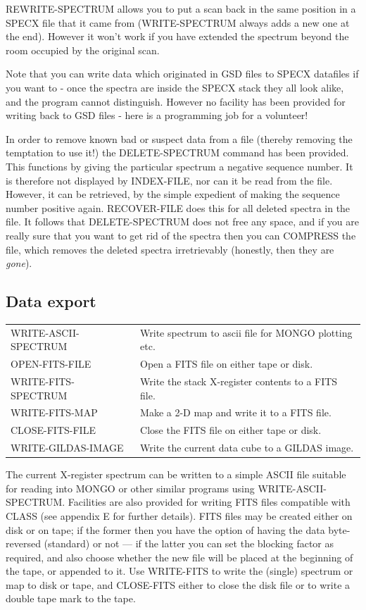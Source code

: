 \documentclass[11pt,twoside]{report}
\begin{document}
REWRITE-SPECTRUM allows you to put a scan back in the same position in a
SPECX file that it came from (WRITE-SPECTRUM always adds a new one at the end).
However it won't work if you have extended the spectrum beyond the room occupied
by the original scan.

Note that you can write data which originated in GSD files to SPECX datafiles
if you want to - once the spectra are inside the SPECX stack they all look
alike, and the program cannot distinguish. However no facility has been provided
for writing back to GSD files - here is a programming job for a volunteer!

In order to remove known bad or suspect data from a file (thereby removing the
temptation to use it!) the DELETE-SPECTRUM command has been provided. This
functions by giving the particular spectrum a negative sequence number. It is
therefore not displayed by INDEX-FILE, nor can it be read from the file.
However, it can be retrieved, by the simple expedient of making the sequence
number positive again. RECOVER-FILE does this for all deleted spectra in the
file. It follows that DELETE-SPECTRUM does not free any space, and if you are
really sure that you want to get rid of the spectra then you can COMPRESS the
file, which removes the deleted spectra irretrievably (honestly, then they are
{\em gone}).

\subsection{Data export}

\begin{tabular}{ll}
WRITE-ASCII-SPECTRUM   & Write spectrum to ascii file for MONGO plotting etc.\\
OPEN-FITS-FILE  & Open a FITS file on either tape or disk.\\
WRITE-FITS-SPECTRUM    & Write the stack X-register contents to a FITS file.\\
WRITE-FITS-MAP         & Make a 2-D map and write it to a FITS file.\\
CLOSE-FITS-FILE        & Close the FITS file on either tape or disk.\\
WRITE-GILDAS-IMAGE     & Write the current data cube to a GILDAS image.\\
\end{tabular}

The current X-register spectrum can be written to a simple ASCII file
suitable for reading into MONGO  or other similar programs using
WRITE-ASCII-SPECTRUM. Facilities are also provided for writing FITS
 files compatible with CLASS  (see appendix E for
further details). FITS files may be created either on disk or on tape; if the
former then you have the option of having the data byte-reversed (standard)
or not --- if the latter you can set the blocking factor as required, and
also choose whether the new file will be placed at the beginning of the tape,
or appended to it. Use WRITE-FITS to write the (single) spectrum or map to disk
or tape, and CLOSE-FITS either to close the disk file or to write a double tape
mark to the tape.
\end{document}
